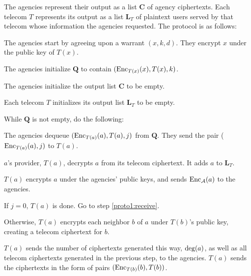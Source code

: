 The agencies represent their output as a list $\mathbf{C}$ of agency
ciphertexts. Each telecom $T$ represents its output as a list
$\mathbf{L}_T$ of plaintext users served by that telecom whose
information the agencies requested.  The protocol is as follows:

\begin{compactenum}

\item The agencies start by agreeing upon a warrant $(x, k, d)$. 
They encrypt $x$ under the public key of $T(x)$.

\item The agencies initialize $\mathbf{Q}$ to contain 
$(\operatorname{Enc}_{T(x)}(x), T(x), k)$.

\item The agencies initialize the output list $\mathbf{C}$ to be empty.

\item Each telecom $T$ initializes its output list $\mathbf{L}_T$ to be empty.

\item While $\mathbf{Q}$ is not empty, do the following:

\begin{compactenum}

\item \label{proto1:top-of-loop} The agencies dequeue $(\operatorname{Enc}_{T(a)}(a), T(a), j)$ from $\mathbf{Q}$. They send the pair ($\operatorname{Enc}_{T(a)}(a), j)$ to $T(a)$.

\item $a$'s provider, $T(a)$, decrypts $a$ from its telecom ciphertext. It adds $a$ to $\mathbf{L}_T$.

\item \label{proto1:first-send} $T(a)$ encrypts $a$ under the agencies' public keys, and sends $\operatorname{Enc}_\mathcal{A}(a)$ to the agencies.

\item If $j=0$, $T(a)$ is done. Go to step \ref{proto1:receive}.

\item Otherwise, $T(a)$ encrypts each neighbor $b$ of $a$ under $T(b)$'s public key, creating a telecom ciphertext for $b$.

\item \label{proto1:second-send} $T(a)$ sends the number of ciphertexts generated this way, $\operatorname{deg}(a)$, as well as all telecom ciphertexts generated in the previous step, to the agencies. $T(a)$ sends the ciphertexts in the form of pairs $(\operatorname{Enc}_{T(b)}(b), T(b))$.


\end{compactenum}
\end{compactenum}
